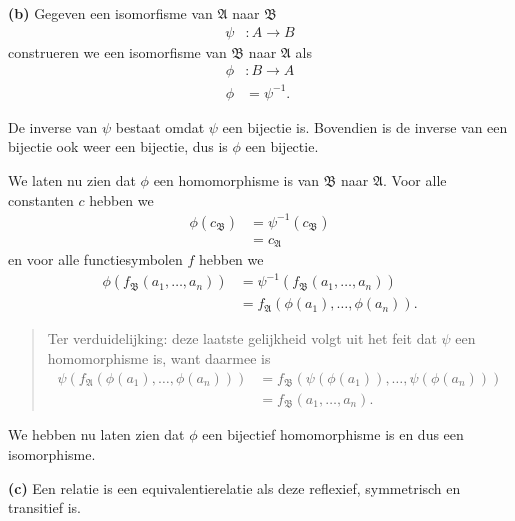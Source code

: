 \documentclass[a4paper,11pt]{article}
\begin{document}
\begin{description}
\item{\bf (b)} %
Gegeven een isomorfisme van $\mathfrak{A}$ naar $\mathfrak{B}$
\begin{align*}
\psi &: A \rightarrow B
\end{align*}
construeren we een isomorfisme van $\mathfrak{B}$ naar $\mathfrak{A}$ als
\begin{align*}
\phi &: B \rightarrow A \\
\phi &= \psi^{-1}.
\end{align*}

De inverse van $\psi$ bestaat omdat $\psi$ een bijectie is. Bovendien is de
inverse van een bijectie ook weer een bijectie, dus is $\phi$ een bijectie.

We laten nu zien dat $\phi$ een homomorphisme is van $\mathfrak{B}$ naar
$\mathfrak{A}$. Voor alle constanten $c$ hebben we
\begin{align*}
\phi(c_{\mathfrak{B}}) &= \psi^{-1}(c_{\mathfrak{B}}) \\
                       &= c_{\mathfrak{A}}
\end{align*}
en voor alle functiesymbolen $f$ hebben we
\begin{align*}
\phi(f_{\mathfrak{B}}(a_{1}, \ldots, a_{n})) &= \psi^{-1}(f_{\mathfrak{B}}(a_{1}, \ldots, a_{n})) \\
                                             &=
                                             f_{\mathfrak{A}}(\phi(a_{1}),
                                             \ldots, \phi(a_{n})).
\end{align*}
\begin{quote}
Ter verduidelijking: deze laatste gelijkheid volgt uit het feit dat $\psi$ een
homomorphisme is, want daarmee is
\begin{align*}
\psi(f_{\mathfrak{A}}(\phi(a_{1}), \ldots, \phi(a_{n}))) &= f_{\mathfrak{B}}(\psi(\phi(a_{1})), \ldots, \psi(\phi(a_{n}))) \\
                                                         &= f_{\mathfrak{B}}(a_{1}, \ldots, a_{n}).
\end{align*}
\end{quote}

We hebben nu laten zien dat $\phi$ een bijectief homomorphisme is en dus een isomorphisme.

\item{\bf (c)} %
Een relatie is een equivalentierelatie als deze reflexief, symmetrisch en
transitief is.


\end{description}
\end{document}
